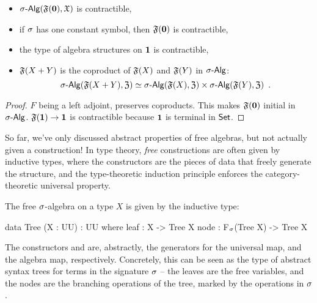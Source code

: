 \begin{proposition}
    \label{prop:free-algebra-colimits}
    \leavevmode
    \begin{itemize}
        \item $\sigAlg(\str{F}(\emptyt), \str{X})$ is contractible,
        \item if $\sigma$ has one constant symbol, then $\mathfrak{F}({\mathbf{0}})$ is contractible,
        \item the type of algebra structures on ${\mathbf{1}}$ is contractible,
        \item $\mathfrak{F}(X + Y)$ is the coproduct of $\mathfrak{F}(X)$ and $\mathfrak{F}(Y)$ in $\sigAlg$:
              \[
                  \sigAlg(\str{F}(X + Y), \str{Z}) \eqv
                  \sigAlg(\str{F}(X), \str{Z}) \times \sigAlg(\str{F}(Y), \str{Z})
                  \enspace.
              \]
    \end{itemize}
\end{proposition}
\begin{proof}
    $F$ being a left adjoint, preserves coproducts.
    This makes $\mathfrak{F}({\mathbf{0}})$ initial in $\sigAlg$.
    $\mathfrak{F}({\mathbf{1}}) \to {\mathbf{1}}$ is contractible because ${\mathbf{1}}$ is terminal in $\mathsf{Set}$.
\end{proof}

So far, we've only discussed abstract properties of free algebras, but not actually given a construction!
%
In type theory, \emph{free} constructions are often given by inductive types,
where the constructors are the pieces of data that freely generate the structure,
and the type-theoretic induction principle enforces the category-theoretic universal property.

\begin{definition}
    \label{algebra:tree}
    \label{def:free-algebra-construction}
    The free $\sigma$-algebra on a type $X$ is given by the inductive type:
    \begin{code}
data Tree (X : UU) : UU where
  leaf : X -> Tree X
  node : F$_\sigma$(Tree X) -> Tree X
    \end{code}
\end{definition}
The constructors  and  are, abstractly,
the generators for the universal map, and the algebra map, respectively.
%
Concretely, this can be seen as the type of abstract syntax trees for terms in the signature $\sigma$
-- the leaves are the free variables, and the nodes are the branching operations of the tree,
marked by the operations in $\sigma$.

